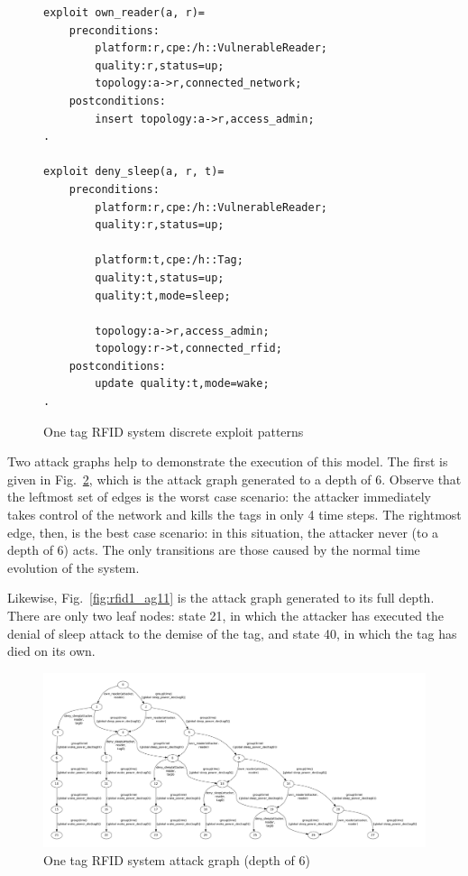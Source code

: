 \begin{figure}
\begin{lstlisting}
exploit own_reader(a, r)=
    preconditions:
        platform:r,cpe:/h::VulnerableReader;
        quality:r,status=up;
        topology:a->r,connected_network;
    postconditions:
        insert topology:a->r,access_admin;
.

exploit deny_sleep(a, r, t)=
    preconditions:
        platform:r,cpe:/h::VulnerableReader;
        quality:r,status=up;
        
        platform:t,cpe:/h::Tag;
        quality:t,status=up;
        quality:t,mode=sleep;
        
        topology:a->r,access_admin;
        topology:r->t,connected_rfid;
    postconditions:
        update quality:t,mode=wake;
.
\end{lstlisting}
\caption{One tag RFID system discrete exploit patterns}
\label{fig:rfid1_token_xp}
\end{figure}

Two attack graphs help to demonstrate the execution of this model. The first is
given in Fig.~\ref{fig:rfid1_ag6}, which is the attack graph generated to a
depth of 6. Observe that the leftmost set of edges is the worst case
scenario: the attacker immediately takes control of the network and kills
the tags in only 4 time steps. The rightmost edge, then, is the best case
scenario: in this situation, the attacker never (to a
depth of 6) acts. The only transitions are those caused by the normal
time evolution of the system.

Likewise, Fig.~\ref{fig:rfid1_ag11} is the attack graph generated to its
full depth. There are only two leaf nodes: state 21, in which the attacker
has executed the denial of sleep attack to the demise of the tag, and state
40, in which the tag has died on its own.

\begin{figure}
\centering
\includegraphics[angle=90,height=0.9\textheight]{ag_dash7/sleep_ag_6}
\caption{One tag RFID system attack graph (depth of 6)}
\label{fig:rfid1_ag6}
\end{figure}

